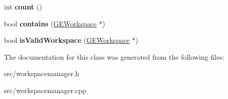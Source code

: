 \begin{DoxyCompactItemize}
\item 
\hypertarget{class_workspace_manager_a9c6b0bad222de7f02fd5e981893c9359}{int {\bfseries count} ()}\label{class_workspace_manager_a9c6b0bad222de7f02fd5e981893c9359}

\item 
\hypertarget{class_workspace_manager_a48e87fb8fa4e464cd2fbe7d647d10c4d}{bool {\bfseries contains} (\hyperlink{class_g_e_workspace}{G\-E\-Workspace} $\ast$)}\label{class_workspace_manager_a48e87fb8fa4e464cd2fbe7d647d10c4d}

\item 
\hypertarget{class_workspace_manager_aabf8ed7d55266e7f339ae63dd9d85d34}{bool {\bfseries is\-Valid\-Workspace} (\hyperlink{class_g_e_workspace}{G\-E\-Workspace} $\ast$)}\label{class_workspace_manager_aabf8ed7d55266e7f339ae63dd9d85d34}

\end{DoxyCompactItemize}


The documentation for this class was generated from the following files\-:\begin{DoxyCompactItemize}
\item 
src/workspacemanager.\-h\item 
src/workspacemanager.\-cpp\end{DoxyCompactItemize}
